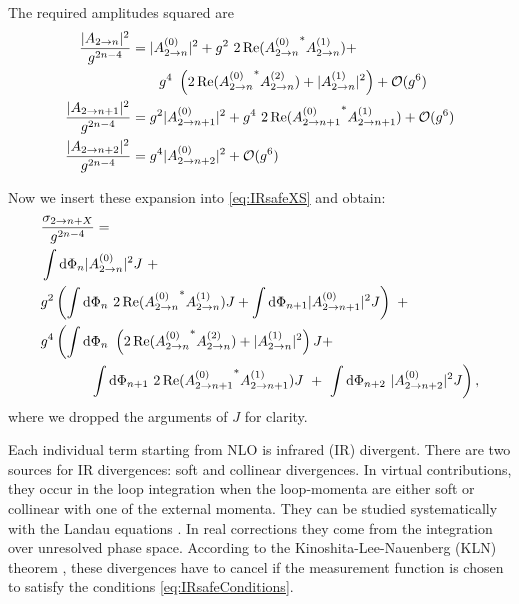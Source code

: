 The required amplitudes squared are
\begin{subequations}
  \begin{align}
    \frac{\vert A_{2\to n} \vert^2}{g^{2n-4}}  &= \vert A^{(0)}_{2\to n} \vert^2 + g^2~2\Re({A^{(0)}_{2\to n}}^{*} A^{(1)}_{2\to n}) + \\ & \qquad g^4~\left(2\Re({A^{(0)}_{2\to n}}^{*} A^{(2)}_{2\to n}) + \vert A^{(1)}_{2\to n} \vert^2 \right)+ \mathcal{O}(g^{6})  \\
    \frac{\vert A_{2\to n+1} \vert^2}{g^{2n-4}} &= g^2 \vert A^{(0)}_{2\to n+1} \vert^2 + g^4~2\Re({A^{(0)}_{2\to n+1}}^{*} A^{(1)}_{2\to n+1}) + \mathcal{O}(g^{6}) \\
    \frac{\vert A_{2\to n+2} \vert^2}{g^{2n-4}} &= g^4 \vert A^{(0)}_{2\to n+2} \vert^2 + \mathcal{O}(g^{6})
  \end{align}
\end{subequations}

Now we insert these expansion into \eqref{eq:IRsafeXS} and obtain:
\begin{subequations}
  \label{eq:NNLO_xs}
  \begin{align}
    \nonumber
    & \frac{\sigma_{2\rightarrow n + X}}{g^{2n-4}} = \\
    & \int \dd\Phi_n \vert A^{(0)}_{2\to n} \vert^2 J  ~+ \\
    & g^{2} \left( \int \dd\Phi_n~2\Re({A^{(0)}_{2\to n}}^{*} A^{(1)}_{2\to n}) J  + \int \dd\Phi_{n+1} \vert A^{(0)}_{2\to n+1} \vert^2 J \right) ~+ \\
    & g^{4} \left( \int \dd\Phi_n~ \left( 2\Re({A^{(0)}_{2\to n}}^{*} A^{(2)}_{2\to n}) + \vert A^{(1)}_{2\to n} \vert^2 \right) J   + \right. \\ 
    \label{eq:RR}
    & \hspace{8ex} \left. \int \dd\Phi_{n+1}~ 2\Re({A^{(0)}_{2\to n+1}}^{*} A^{(1)}_{2\to n+1}) J ~+~ \int \dd\Phi_{n+2}~ \vert A^{(0)}_{2\to n+2} \vert^2 J \right),
  \end{align}
\end{subequations}
where we dropped the arguments of $J$ for clarity. 

Each individual term starting from NLO is infrared (IR) divergent.
There are two sources for IR divergences: soft and collinear divergences.
In virtual contributions, they occur in the loop integration when the loop-momenta are
either soft or collinear with one of the external momenta.
They can be studied systematically with the Landau equations \cite{Landau1959}.
In real corrections they come from the integration over unresolved phase space.
According to the Kinoshita-Lee-Nauenberg (KLN) theorem \cite{Kinoshita1962,Lee1964},
these divergences have to cancel if the measurement function is chosen to satisfy the conditions \eqref{eq:IRsafeConditions}.

